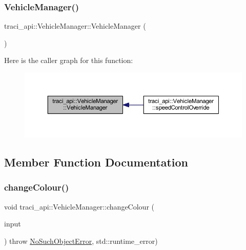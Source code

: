 \subsubsection{\texorpdfstring{Vehicle\+Manager()}{VehicleManager()}}
{\footnotesize\ttfamily traci\+\_\+api\+::\+Vehicle\+Manager\+::\+Vehicle\+Manager (\begin{DoxyParamCaption}\item[{\hyperlink{classtraci__api_1_1_vehicle_manager}{Vehicle\+Manager} const \&}]{ }\end{DoxyParamCaption})\hspace{0.3cm}{\ttfamily [delete]}}

Here is the caller graph for this function\+:
\nopagebreak
\begin{figure}[H]
\begin{center}
\leavevmode
\includegraphics[width=350pt]{classtraci__api_1_1_vehicle_manager_a7e9e05b65776f0709f0b84a51c44377f_icgraph}
\end{center}
\end{figure}


\subsection{Member Function Documentation}
\mbox{\label{classtraci__api_1_1_vehicle_manager_a6829e259033dcd95611755953f164ef0}} 
\subsubsection{\texorpdfstring{change\+Colour()}{changeColour()}}
{\footnotesize\ttfamily void traci\+\_\+api\+::\+Vehicle\+Manager\+::change\+Colour (\begin{DoxyParamCaption}\item[{\hyperlink{classtcpip_1_1_storage}{tcpip\+::\+Storage} \&}]{input }\end{DoxyParamCaption}) throw  \hyperlink{classtraci__api_1_1_no_such_object_error}{No\+Such\+Object\+Error}, std\+::runtime\+\_\+error) }

